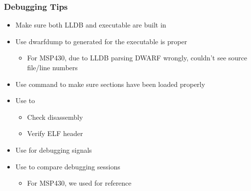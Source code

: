 \begin{frame}[fragile]
\frametitle{Debugging Tips}
\begin{itemize}
    \item Make sure both LLDB and executable are built in  
    \item Use dwarfdump to  generated for the executable is proper
    \begin{itemize}
        \item For MSP430, due to LLDB parsing DWARF wrongly, couldn't see source file/line numbers
    \end{itemize}
    \item Use  command to make sure sections have been loaded properly
    \item Use  to
    \begin{itemize}
        \item Check disassembly
        \item Verify ELF header
    \end{itemize}
    \item Use  for debugging signals
    \item Use  to compare debugging sessions
    \begin{itemize}
        \item For MSP430, we used  for reference
    \end{itemize}
\end{itemize}
\end{frame}



